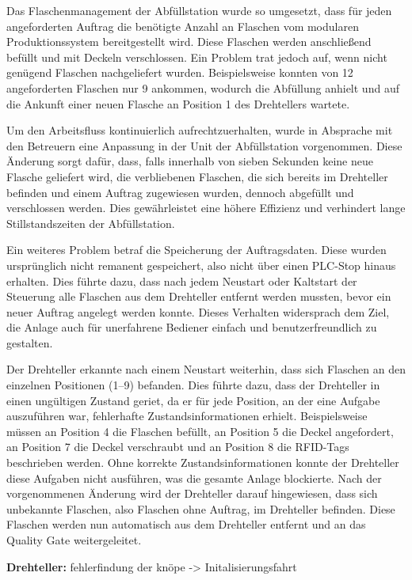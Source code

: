 Das Flaschenmanagement der Abfüllstation wurde so umgesetzt, dass für jeden angeforderten Auftrag die benötigte Anzahl an Flaschen vom modularen 
Produktionssystem bereitgestellt wird. Diese Flaschen werden anschließend befüllt und mit Deckeln verschlossen. Ein Problem trat jedoch auf, wenn 
nicht genügend Flaschen nachgeliefert wurden. Beispielsweise konnten von 12 angeforderten Flaschen nur 9 ankommen, wodurch die Abfüllung anhielt 
und auf die Ankunft einer neuen Flasche an Position 1 des Drehtellers wartete.

Um den Arbeitsfluss kontinuierlich aufrechtzuerhalten, wurde in Absprache mit den Betreuern eine Anpassung in der Unit der Abfüllstation 
vorgenommen. Diese Änderung sorgt dafür, dass, falls innerhalb von sieben Sekunden keine neue Flasche geliefert wird, die verbliebenen Flaschen, 
die sich bereits im Drehteller befinden und einem Auftrag zugewiesen wurden, dennoch abgefüllt und verschlossen werden. Dies gewährleistet eine 
höhere Effizienz und verhindert lange Stillstandszeiten der Abfüllstation.

Ein weiteres Problem betraf die Speicherung der Auftragsdaten. Diese wurden ursprünglich nicht remanent gespeichert, also nicht über einen 
PLC-Stop hinaus erhalten. Dies führte dazu, dass nach jedem Neustart oder Kaltstart der Steuerung alle Flaschen aus dem Drehteller entfernt 
werden mussten, bevor ein neuer Auftrag angelegt werden konnte. Dieses Verhalten widersprach dem Ziel, die Anlage auch für unerfahrene Bediener 
einfach und benutzerfreundlich zu gestalten.

Der Drehteller erkannte nach einem Neustart weiterhin, dass sich Flaschen an den einzelnen Positionen (1–9) befanden. Dies führte dazu, dass der 
Drehteller in einen ungültigen Zustand geriet, da er für jede Position, an der eine Aufgabe auszuführen war, fehlerhafte Zustandsinformationen 
erhielt. Beispielsweise müssen an Position 4 die Flaschen befüllt, an Position 5 die Deckel angefordert, an Position 7 die Deckel verschraubt 
und an Position 8 die RFID-Tags beschrieben werden. Ohne korrekte Zustandsinformationen konnte der Drehteller diese Aufgaben nicht ausführen, 
was die gesamte Anlage blockierte. Nach der vorgenommenen Änderung wird der Drehteller darauf hingewiesen, dass sich unbekannte Flaschen, also 
Flaschen ohne Auftrag, im Drehteller befinden. Diese Flaschen werden nun automatisch aus dem Drehteller entfernt und an das Quality Gate 
weitergeleitet.

\textbf{Drehteller:} 
fehlerfindung der knöpe -> Initalisierungsfahrt 

